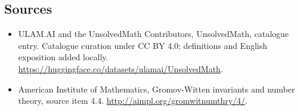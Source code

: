 \documentclass[11pt]{article}
\begin{document}
\subsection{Sources}
\begin{itemize}
\item[\hypertarget{source:statement:1}{S1}] ULAM.AI and the UnsolvedMath Contributors, UnsolvedMath, catalogue entry. Catalogue curation under CC BY 4.0; definitions and English exposition added locally.
\url{https://huggingface.co/datasets/ulamai/UnsolvedMath}.
\item[\hypertarget{source:statement:2}{S2}] American Institute of Mathematics, Gromov-Witten invariants and number theory, source item 4.4.
\url{http://aimpl.org/gromwitnumthry/4/}.
\end{itemize}
\label{end:statement}
\end{document}
